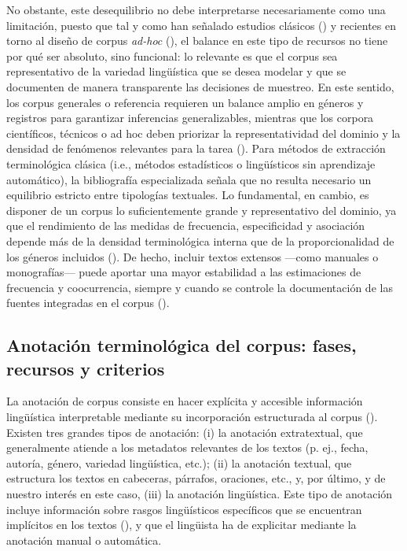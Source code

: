 No obstante, este desequilibrio no debe interpretarse necesariamente como una limitación, puesto que tal y como han señalado estudios clásicos (\cite{Zweigenbaum2001}) y recientes en torno al diseño de corpus \textit{ad-hoc} (\cite{Gupta2021, Yang2023}), el balance en este tipo de recursos no tiene por qué ser absoluto, sino funcional: lo relevante es que el corpus sea representativo de la variedad lingüística que se desea modelar y que se documenten de manera transparente las decisiones de muestreo. En este sentido, los corpus generales o referencia requieren un balance amplio en géneros y registros para garantizar inferencias generalizables, mientras que los corpora científicos, técnicos o ad hoc deben priorizar la representatividad del dominio y la densidad de fenómenos relevantes para la tarea (\cite{VandenAuken2014, Nastou2024}). Para métodos de extracción terminológica clásica (i.e., métodos estadísticos o lingüísticos sin aprendizaje automático), la bibliografía especializada señala que no resulta necesario un equilibrio estricto entre tipologías textuales. Lo fundamental, en cambio, es disponer de un corpus lo suficientemente grande y representativo del dominio, ya que el rendimiento de las medidas de frecuencia, especificidad y asociación depende más de la densidad terminológica interna que de la proporcionalidad de los géneros incluidos (\cite{Yamamoto2001,Fuentes2001}). De hecho, incluir textos extensos —como manuales o monografías— puede aportar una mayor estabilidad a las estimaciones de frecuencia y coocurrencia, siempre y cuando se controle la documentación de las fuentes  integradas en el corpus (\cite{Kruger2012, Braun2007}).

\subsection{Anotación terminológica del corpus: fases, recursos y criterios} \label{anotacion}

La anotación de corpus consiste en hacer explícita y accesible información lingüística interpretable mediante su incorporación estructurada al corpus (\cite{lavid2005lenguaje,leech2004,hajicova2010treebank}). Existen tres grandes tipos de anotación: (i) la anotación extratextual, que generalmente atiende a los metadatos relevantes de los textos (p. ej., fecha, autoría, género, variedad lingüística, etc.); (ii) la anotación textual, que estructura los textos en cabeceras, párrafos, oraciones, etc., y, por último, y de nuestro interés en este caso, (iii) la anotación lingüística. Este tipo de anotación incluye información sobre rasgos lingüísticos específicos que se encuentran implícitos en los textos (\cite{lavid2005lenguaje}), y que el lingüista ha de explicitar mediante la anotación manual o automática.

